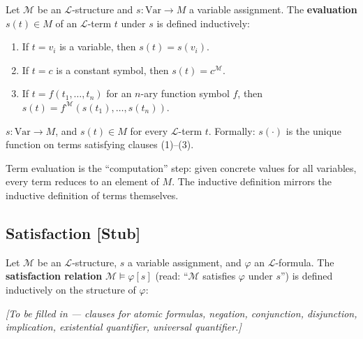 \begin{tcolorbox}[colback=propbox, colframe=propborder, arc=2pt,
  left=6pt, right=6pt, top=4pt, bottom=4pt,
  title={\small\textbf{Definition (Term Evaluation)}},
  fonttitle=\small\bfseries]
\label{def:term-evaluation}
Let $\mathcal{M}$ be an $\mathcal{L}$-structure and $s : \mathrm{Var} \to M$
a variable assignment.
The \textbf{evaluation} $s(t) \in M$ of an $\mathcal{L}$-term $t$ under
$s$ is defined inductively:
\begin{enumerate}
  \item If $t = v_i$ is a variable, then $s(t) = s(v_i)$.
  \item If $t = c$ is a constant symbol, then $s(t) = c^{\mathcal{M}}$.
  \item If $t = f(t_1, \ldots, t_n)$ for an $n$-ary function symbol $f$,
        then $s(t) = f^{\mathcal{M}}(s(t_1), \ldots, s(t_n))$.
\end{enumerate}
\end{tcolorbox}

\begin{remark*}
$s : \mathrm{Var} \to M$, and $s(t) \in M$ for every $\mathcal{L}$-term $t$.
Formally: $s(\cdot)$ is the unique function on terms satisfying clauses (1)--(3).
\end{remark*}

\begin{remark*}[Intuition]
Term evaluation is the ``computation'' step: given concrete values for
all variables, every term reduces to an element of $M$. The inductive
definition mirrors the inductive definition of terms themselves.
\end{remark*}


\subsection{Satisfaction \textnormal{[Stub]}}

\begin{tcolorbox}[colback=propbox, colframe=propborder, arc=2pt,
  left=6pt, right=6pt, top=4pt, bottom=4pt,
  title={\small\textbf{Definition (Satisfaction, $\mathcal{M} \models \varphi[s]$) — Stub}},
  fonttitle=\small\bfseries]
\label{def:satisfaction}
Let $\mathcal{M}$ be an $\mathcal{L}$-structure, $s$ a variable assignment,
and $\varphi$ an $\mathcal{L}$-formula.
The \textbf{satisfaction relation} $\mathcal{M} \models \varphi[s]$
(read: ``$\mathcal{M}$ satisfies $\varphi$ under $s$'') is defined
inductively on the structure of $\varphi$:

\medskip
\textit{[To be filled in — clauses for atomic formulas, negation,
conjunction, disjunction, implication, existential quantifier,
universal quantifier.]}
\end{tcolorbox}

